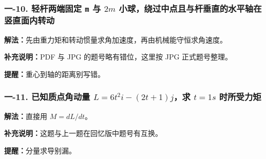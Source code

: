 \documentclass[12pt,a4paper]{ctexart}
\begin{document}
\subsubsection*{一-10. 轻杆两端固定 \texttt{m} 与 \(2m\) 小球，绕过中点且与杆垂直的水平轴在竖直面内转动}
\begin{tcolorbox}[colback=gray!2!white,colframe=black!60,title={题目}]

\end{tcolorbox}
\begin{tcolorbox}[colback=blue!2!white,colframe=blue!55!black,title={完整答案}]
\textbf{解法：}先由重力矩和转动惯量求角加速度，再由机械能守恒求角速度。\par

\textbf{补充说明：}PDF 与 JPG 的题号略有错位，这里按 JPG 正式题号整理。\par
\end{tcolorbox}
\begin{tcolorbox}[colback=red!2!white,colframe=red!55!black,title={易错点}]
\textbf{提醒：}重心到轴的距离别写错。\par
\end{tcolorbox}

\subsubsection*{一-11. 已知质点角动量 \(L=6t^2 i-(2t+1)j\)，求 \(t=1 s\) 时所受力矩}
\begin{tcolorbox}[colback=gray!2!white,colframe=black!60,title={题目}]

\end{tcolorbox}
\begin{tcolorbox}[colback=blue!2!white,colframe=blue!55!black,title={完整答案}]
\textbf{解法：}直接用 \(M=dL/dt\)。\par

\textbf{补充说明：}这题与上一题在回忆版中题号有互换。\par
\end{tcolorbox}
\begin{tcolorbox}[colback=red!2!white,colframe=red!55!black,title={易错点}]
\textbf{提醒：}分量求导别漏。\par
\end{tcolorbox}
\end{document}
